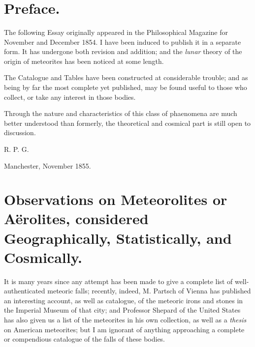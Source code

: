 \documentclass[a4paper, 12pt, oneside]{article}
\begin{document}
\setlength{\parskip}{1mm plus1mm minus1mm}
\setcounter{tocdepth}{3}
\setcounter{secnumdepth}{3}
\pagestyle{fancy}
\fancyhf{}
\cfoot{\Fontauri{\thepage}}
\tableofcontents
\clearpage
\Large
\section*{Preface.}
\paragraph{}
The following Essay originally appeared in the Philosophical Magazine for November and December 1854. I have been induced to publish it in a separate form. It has undergone both revision and addition; and the \emph{lunar} theory of the origin of meteorites has been noticed at some length.

The Catalogue and Tables have been constructed at considerable trouble; and as being by far the most complete yet published, may be found useful to those who collect, or take any interest in those bodies.

Through the nature and characteristics of this class of phaenomena are much better understood than formerly, the theoretical and cosmical part is still open to discussion.

\bigskip

R. P. G.

\bigskip

Manchester, November 1855.
\clearpage
\section{Observations on Meteorolites or Aërolites, considered Geographically, Statistically, and Cosmically.}
\paragraph{}
It is many years since any attempt has been made to give a complete list of well-authenticated meteoric falls; recently, indeed, M. Partsch of Vienna has published an interesting account, as well as catalogue, of the meteoric irons and stones in the Imperial Museum of that city; and Professor Shepard of the United States has also given us a list of the meteorites in his own collection, as well as a \emph{thesis} on American meteorites; but I am ignorant of anything approaching a complete or compendious catalogue of the falls of these bodies.
\end{document}
